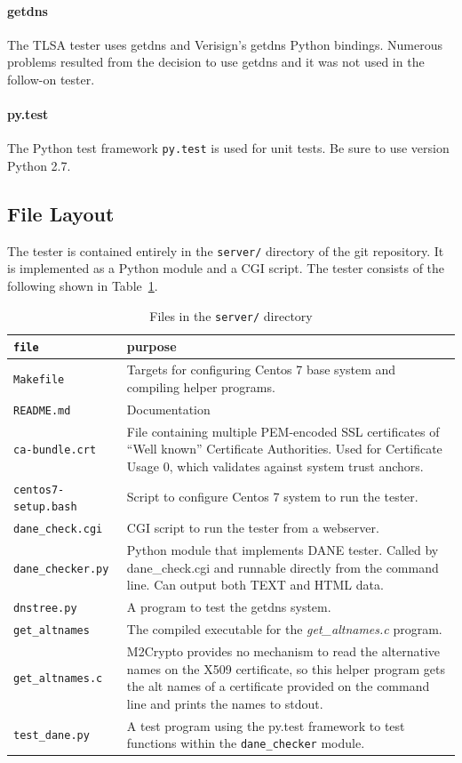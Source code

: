 \documentclass[preprint,3p]{elsarticle}
\begin{document}
\paragraph{getdns} The TLSA tester uses getdns and Verisign's getdns Python
bindings. Numerous problems resulted from the decision to use getdns
and it was not used in the follow-on tester.

\paragraph{py.test} The Python test framework \texttt{py.test} is used
for unit tests. Be sure to use version Python 2.7.

\subsection{File Layout}

The tester is contained entirely in the {\tt server/} directory of the
git repository. It is implemented as a Python module and a CGI
script. The tester consists of the following shown in Table~\ref{tlsa}.

\begin{table}
\begin{tabularx}{\textwidth}{>{\tt}lX}
file & purpose\\
\hline
Makefile & Targets for configuring Centos 7 base system and compiling helper programs. \\
README.md & Documentation \\
ca-bundle.crt & File containing multiple PEM-encoded SSL certificates of ``Well known'' Certificate Authorities. Used for Certificate Usage 0, which validates against system trust anchors. \\
centos7-setup.bash & Script to configure Centos 7 system to run the tester. \\
dane\_check.cgi & CGI script to run the tester from a webserver.\\
dane\_checker.py & Python module that implements DANE tester. Called by dane\_check.cgi and runnable directly from the command line. Can output both TEXT and HTML data.\\
dnstree.py & A program to test the getdns system.\\
get\_altnames & The compiled executable for the \emph{get\_altnames.c} program.\\
get\_altnames.c & M2Crypto provides no mechanism to read the alternative names on the X509 certificate, so this helper program gets the alt names of a certificate provided on the command line and prints the names to stdout.\\
test\_dane.py & A test program using the py.test framework to test functions within the {\tt dane\_checker} module.\\
\end{tabularx}
\caption{Files in the \texttt{server/} directory}\label{tlsa}
\end{table}
\end{document}
